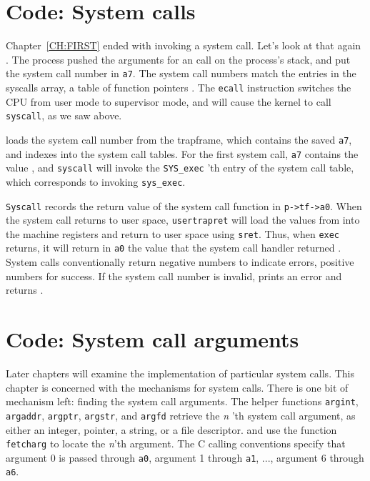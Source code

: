 \section{Code: System calls}

Chapter~\ref{CH:FIRST} ended with 
invoking a system call.
Let's look at that again
.
The process pushed the arguments
for an 
call on the process's stack, and put the
system call number in
\texttt{a7}.
The system call numbers match the entries in the syscalls array,
a table of function pointers
.
The \lstinline{ecall} instruction
switches the CPU from user mode to supervisor mode, and will
cause the kernel to call \lstinline{syscall}, as we saw above.

loads the system call number from the trapframe, which
contains the saved
\texttt{a7},
and indexes into the system call tables.
For the first system call, 
\texttt{a7}
contains the value 
,
and
\lstinline{syscall}
will invoke the 
\lstinline{SYS_exec} 'th 
entry of the system call table, which corresponds to invoking
\lstinline{sys_exec}.

\lstinline{Syscall}
records the return value of the system call function in
\lstinline{p->tf->a0}.
When the system call returns to user space,
\lstinline{usertrapret}
will load the values
from
into the machine registers
and return to user space
using
\lstinline{sret}.
Thus, when 
\lstinline{exec}
returns, it will return in \lstinline{a0} the value
that the system call handler returned
.
System calls conventionally return negative numbers to indicate
errors, positive numbers for success.
If the system call number is invalid,
prints an error and returns .

\section{Code: System call arguments}

Later chapters will examine the implementation of
particular system calls.
This chapter is concerned with the mechanisms for system calls.
There is one bit of mechanism left: finding the system call arguments.
The helper functions
\lstinline{argint},
\lstinline{argaddr},
\lstinline{argptr},
\lstinline{argstr},
and
\lstinline{argfd}
retrieve the 
\textit{n} 'th 
system call
argument, as either an integer, pointer, a string, or a file descriptor.
and
use the function
\lstinline{fetcharg}
to locate the
\textit{n}'th 
argument. The C calling conventions specify that argument 0 is passed
through
\texttt{a0},
argument 1 through
\texttt{a1}, ...,
argument 6 through
\texttt{a6}.

